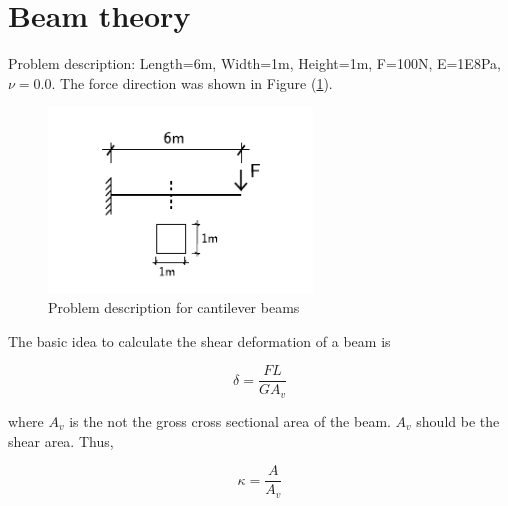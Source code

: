 \documentclass[fleqn,11pt]{article}
\begin{document}

\thispagestyle{fancy}


\tableofcontents{}





\newpage



\newpage



\section{Beam theory}

Problem description: Length=6m, Width=1m, Height=1m, F=100N, E=1E8Pa, $\nu=0.0$. The force direction was shown in Figure (\ref{fig Problem description for cantilever beam theory}). 

\begin{figure}[H]
  \centering
  \includegraphics[width=7cm]{../Figure-files/cantilever_6.pdf}
  \caption{Problem description for cantilever beams}
  \label{fig Problem description for cantilever beam theory}
\end{figure}


The basic idea to calculate the shear deformation of a beam is 

\begin{equation}
  \delta=\frac{FL}{GA_v}
\end{equation}

where $A_v$ is the not the gross cross sectional area of the beam. $A_v$ should be the shear area. Thus,

\begin{equation}
  \kappa = \frac{A}{A_v}
\end{equation}
\end{document}
